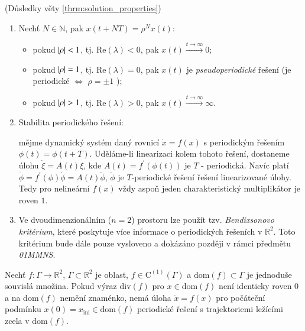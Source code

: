 \begin{remark}
	(Důsledky věty \ref{thrm:solution_properties})
	\begin{enumerate}
		\item Nechť $N \in \mathbb{N}$, pak $x(t+NT) = \rho^{N} x(t)$:
		
		\begin{itemize}
			\item pokud $\left|\rho\right| < 1$, tj. $\mathrm{Re} (\lambda )< 0$, pak $x(t) \xrightarrow{t \rightarrow \infty} 0$;
			
			\item pokud $\left|\rho\right| = 1$, tj. $\mathrm{Re} (\lambda) = 0$, pak $x(t)$ je \textit{pseudoperiodické} řešení (je periodické $\iff$ $\rho = \pm 1$ );
			
			\item pokud $\left|\rho\right| > 1$, tj. $\mathrm{Re} (\lambda) > 0$, pak $x(t) \xrightarrow{t \rightarrow \infty} \infty$.
		\end{itemize}
	
		\item Stabilita periodického řešení:
		
		mějme dynamický systém daný rovnicí $\dot{x} = f(x)$ s periodickým řešením $\phi(t) = \phi(t+T)$. Uděláme-li linearizaci kolem tohoto řešení, dostaneme úlohu $\dot{\xi} = A(t) \xi$, kde $A(t) = f^{\prime} (\phi(t))$ je $T$ - periodická. Navíc platí $\ddot{\phi} = f^{\prime}(\phi) \dot{\phi} = A(t) \dot{\phi}$, $\dot{\phi}$ je $T$-periodické řešení řešení linearizované úlohy. Tedy pro nelineární $f(x)$ vždy aspoň jeden charakteristický multiplikátor je roven $1$.
		
		\item Ve dvoudimenzionálním ($n = 2$) prostoru lze použít tzv. \textit{Bendixsonovo kritérium}, které poskytuje více informace o periodických řešeních v $\mathbb{R}^{2}$. Toto kritérium bude dále pouze vysloveno a dokázáno později v rámci předmětu \textit{01MMNS}.
	\end{enumerate}
\end{remark}

\medskip

\begin{thrm}\label{thrm:bendixson}
	Nechť $f: \Gamma \rightarrow \mathbb{R}^{2}$, $\Gamma \subset \mathbb{R}^{2}$ je oblast, $f \in \mathrm{C}^{(1)}(\Gamma)$ a $\mathrm{dom}(f) \subset \Gamma$ je jednoduše souvislá množina. Pokud výraz $\mathrm{div}(f)$ pro $x \in \mathrm{dom}(f)$ není identicky roven $0$ a na  $\mathrm{dom}(f)$ nemění znaménko, nemá úloha $\dot{x} = f(x)$ pro počáteční podmínku $x(0) = x_{\mathrm{ini}} \in \mathrm{dom}(f)$ periodické řešení s trajektoriemi ležícími zcela v $\mathrm{dom}(f)$.
\end{thrm}

